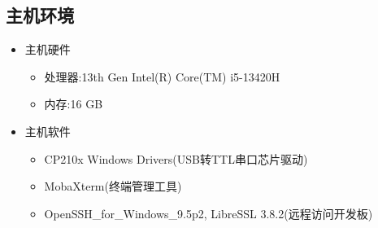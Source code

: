 \subsection{主机环境}
\begin{itemize}
    \item 主机硬件
    \begin{itemize}
        \item 处理器:13th Gen Intel(R) Core(TM) i5-13420H
        \item 内存:16 GB
    \end{itemize}
    \item 主机软件
    \begin{itemize}
        \item CP210x Windows Drivers(USB转TTL串口芯片驱动)
        \item MobaXterm(终端管理工具)
        \item OpenSSH\_for\_Windows\_9.5p2, LibreSSL 3.8.2(远程访问开发板)
    \end{itemize}
\end{itemize}
